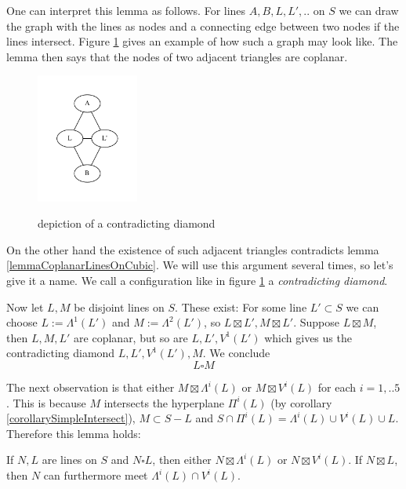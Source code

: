 One can interpret this lemma as follows.
For lines $A,B,L,L',..$ on $S$ we can draw the graph with the lines as nodes and a connecting edge between two nodes if the lines intersect.
Figure \ref{graph} gives an example of how such a graph may look like.
The lemma then says that the nodes of two adjacent triangles are coplanar.
\begin{figure}
\center
\includegraphics[width=0.3\textwidth]{img/intersectiongraph.pdf}
\label{graph}
\caption{depiction of a contradicting diamond }
\end{figure}
On the other hand the existence of such adjacent triangles contradicts lemma \ref{lemmaCoplanarLinesOnCubic}.
We will use this argument several times, so let's give it a name. We call a configuration like in figure \ref{graph} a \emph{contradicting diamond}.

Now let $L,M$ be disjoint lines on $S$.
These exist: For some line $L' \subset S$ we can choose $L := \Lambda^1(L')$ and $M := \Lambda^2(L')$, so $L \boxtimes L', M \boxtimes L'$.
Suppose $L\boxtimes M$, then $L,M,L'$ are coplanar, but so are $L,L',V^1(L')$ which gives us the contradicting diamond $L,L',V^1(L'),M$.
We conclude
\begin{equation*}
L\square M
\end{equation*}

The next observation is that either $M\boxtimes \Lambda^i(L)$ or $M\boxtimes V^i(L)$ for each $i=1,..5$.
This is because $M$ intersects the hyperplane $\Pi^i(L)$ (by corollary \ref{corollarySimpleIntersect}), $M \subset S - L$ and $S \cap \Pi^i(L) = \Lambda^i(L) \cup V^i(L) \cup L$. Therefore this lemma holds:
\begin{lemma} \label{lemmaBinaryIntersection}
If $N, L$ are lines on $S$ and $N \square L$, then either $N \boxtimes \Lambda^i(L)$ or $N \boxtimes V^i(L)$.
If $N\boxtimes L$, then $N$ can furthermore meet $\Lambda^i(L)\cap V^i(L)$.
\end{lemma}

